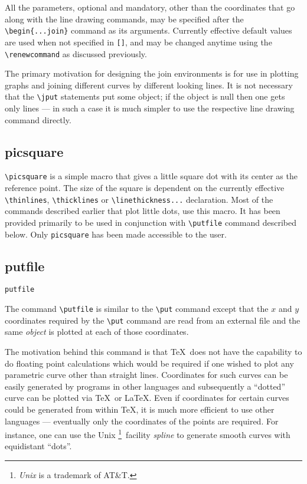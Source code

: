 All the parameters, optional and mandatory, other than the coordinates that
go along with the line drawing commands, may be specified after the
\verb|\begin{...join}| command as its arguments. Currently effective default
values are used when not specified in {\tt []}, and may be changed anytime
using the \verb|\renewcommand| as discussed previously.

The primary motivation for designing the join environments is for use in
plotting graphs and joining different curves by different looking lines.
It is not necessary that the \verb|\jput| statements put some object; if
the object is null then one gets only lines --- in such a case it is much
simpler to use the respective line drawing command directly.

\subsection{{\tt \bs}picsquare}

\verb|\picsquare| is a simple macro that gives a little square dot with its
center as the reference point. The size of the square is dependent on the
currently effective \verb|\thinlines|, \verb|\thicklines| or
\verb|\linethickness...| declaration. Most of the commands described earlier
that plot little dots, use this macro\footnotemark. It has been provided
primarily to be used in conjunction with \verb|\putfile| command described
below.
Only {\tt \bs picsquare} has been made accessible to the user.

\subsection{{\tt \bs}putfile}

{\tt \bs putfile\rb{}\rb}

The command \verb|\putfile| is similar to the \verb|\put| command except that
the $x$ and $y$ coordinates required by the \verb|\put| command are read from
an external file and the same {\it object} is plotted at each of those
coordinates.

The motivation behind this command is that \TeX\ does not have the capability
to do floating point calculations which would be required if one wished
to plot any parametric curve other than straight lines. Coordinates for such
curves can be easily generated by programs in other languages and
subsequently a ``dotted'' curve can be plotted via \TeX\ or \LaTeX. Even if
coordinates for certain curves could be generated from within \TeX, it is
much more efficient to use other languages --- eventually only the
coordinates of the points are required.
For instance, one can use the Unix%
\footnote{{\it Unix} is a trademark of AT\&T.}\ facility
{\it spline\/} to generate smooth curves with equidistant ``dots''.

